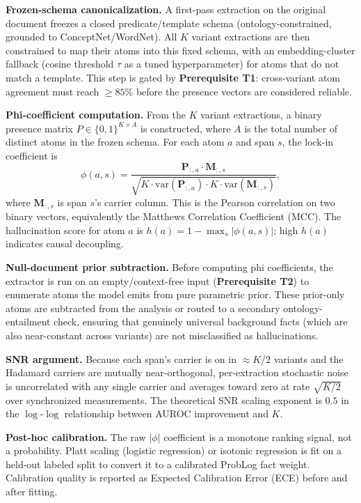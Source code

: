 \documentclass[11pt,letterpaper]{article}
\begin{document}
\textbf{Frozen-schema canonicalization.} A first-pass extraction on the original document freezes a closed
predicate/template schema (ontology-constrained, grounded to ConceptNet/WordNet). All $K$ variant extractions are then
constrained to map their atoms into this fixed schema, with an embedding-cluster fallback (cosine threshold $\tau$ as a
tuned hyperparameter) for atoms that do not match a template. This step is gated by \textbf{Prerequisite T1}:
cross-variant atom agreement must reach $\geq 85\%$ before the presence vectors are considered reliable.

\textbf{Phi-coefficient computation.} From the $K$ variant extractions, a binary presence matrix
$P \in \{0,1\}^{K \times A}$ is constructed, where $A$ is the total number of distinct atoms in the frozen schema.
For each atom $a$ and span $s$, the lock-in coefficient is
\begin{equation}
  \phi(a, s) = \frac{\mathbf{P}_{:,a} \cdot \mathbf{M}_{:,s}}{\sqrt{K \cdot \mathrm{var}(\mathbf{P}_{:,a}) \cdot K \cdot \mathrm{var}(\mathbf{M}_{:,s})}},
\end{equation}
where $\mathbf{M}_{:,s}$ is span $s$'s carrier column. This is the Pearson correlation on two binary vectors,
equivalently the Matthews Correlation Coefficient (MCC). The hallucination score for atom $a$ is
$h(a) = 1 - \max_s |\phi(a,s)|$; high $h(a)$ indicates causal decoupling.

\textbf{Null-document prior subtraction.} Before computing phi coefficients, the extractor is run on an
empty/context-free input (\textbf{Prerequisite T2}) to enumerate atoms the model emits from pure parametric prior.
These prior-only atoms are subtracted from the analysis or routed to a secondary ontology-entailment check, ensuring
that genuinely universal background facts (which are also near-constant across variants) are not misclassified as
hallucinations.

\textbf{SNR argument.} Because each span's carrier is on in $\approx K/2$ variants and the Hadamard carriers are
mutually near-orthogonal, per-extraction stochastic noise is uncorrelated with any single carrier and averages toward
zero at rate $\sqrt{K/2}$ over synchronized measurements. The theoretical SNR scaling exponent is $0.5$ in the
$\log$-$\log$ relationship between AUROC improvement and $K$.

\textbf{Post-hoc calibration.} The raw $|\phi|$ coefficient is a monotone ranking signal, not a probability. Platt
scaling (logistic regression) or isotonic regression is fit on a held-out labeled split to convert it to a calibrated
ProbLog fact weight. Calibration quality is reported as Expected Calibration Error (ECE) before and after fitting.
\end{document}
